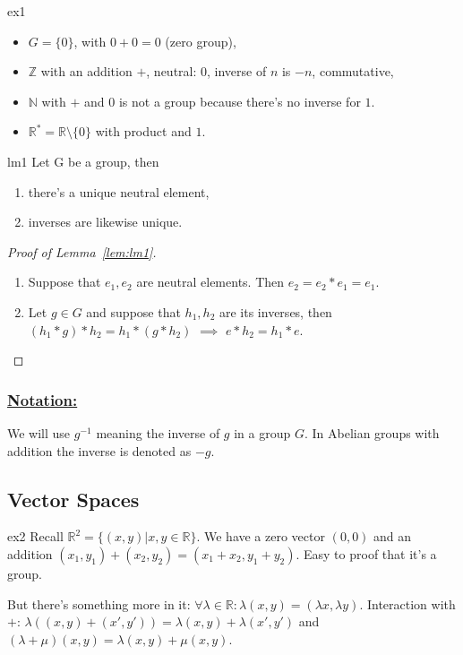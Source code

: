 \documentclass[11pt, a4paper]{article}
\newcommand{\R}{\mathbb{R}}
\newcommand{\N}{\mathbb{N}}
\newcommand{\Z}{\mathbb{Z}}
\begin{document}
\begin{example}{}{ex1}
  \begin{itemize}
    \item $G = \{0\}$, with $0 + 0 = 0$ (zero group),
    \item $\Z$ with an addition $+$, neutral: $0$, inverse of $n$ is $-n$, commutative,
    \item $\N$ with $+$ and $0$ is not a group because there's no inverse for $1$.
    \item $\R ^* = \R \setminus \{0\}$ with product and $1$.
  \end{itemize}
\end{example}

\begin{lemma}{}{lm1}
  Let G be a group, then
  \begin{enumerate}
    \item there's a unique neutral element,
    \item inverses are likewise unique.
  \end{enumerate}
\end{lemma}

\begin{proof}[Proof of Lemma~\ref{lem:lm1}]
  \begin{enumerate}
    \item Suppose that $e_1, e_2$ are neutral elements. Then $e_2 = e_2 * e_1 = e_1$.
    \item Let $g \in G$ and suppose that $h_1, h_2$ are its inverses, then $(h_1 * g) * h_2 = h_1 * (g * h_2)$ $\implies$ $e * h_2 = h_1 * e$.
  \end{enumerate}

\end{proof}

\subsubsection*{\underline{Notation:}}
We will use $g^{-1}$ meaning the inverse of $g$ in a group $G$. In Abelian groups with addition the inverse is denoted as $-g$.

\subsection{Vector Spaces}

\begin{example}{}{ex2}
  Recall $\R ^2 = \{(x, y) | x, y \in \R\}$. We have a zero vector $(0,0)$ and an addition $(x_1, y_1) + (x_2, y_2) = (x_1 + x_2, y_1 + y_2)$. Easy to proof that it's a group. 
  
  But there's something more in it: $\forall \lambda \in \R : \lambda (x, y) = (\lambda x, \lambda y)$.
  Interaction with $+$: $\lambda ((x, y) + (x', y')) = \lambda (x, y) + \lambda (x', y')$ and $(\lambda + \mu) (x, y) = \lambda (x, y) + \mu (x, y)$.
\end{example}
\end{document}
